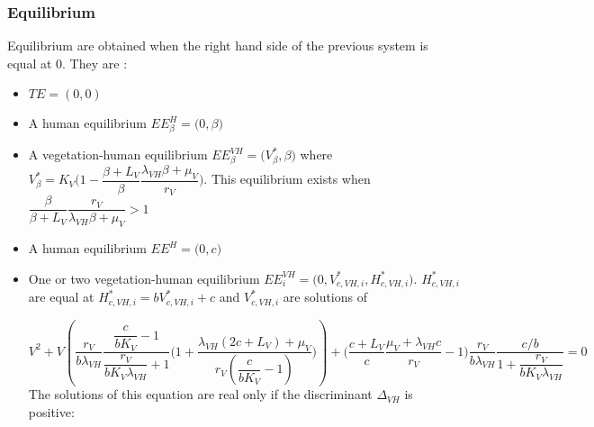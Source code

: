 \documentclass{article}
\newcommand{\lv}{\lambda_{VH}}
\begin{document}
\subsubsection{Equilibrium}
Equilibrium are obtained when the right hand side of the previous system is equal at 0. They are :
\begin{itemize}
\item $TE = (0,0)$
\item A human equilibrium $EE^H_\beta = \Big(0,\beta \Big)$
\item A vegetation-human equilibrium $EE^{VH}_\beta = \Big(V^*_{\beta}, \beta \Big)$ where $V^*_\beta = K_V \Big(1- \dfrac{\beta + L_V}{\beta} \dfrac{\lv \beta + \mu_V}{r_V} \Big)$. This equilibrium exists when $\dfrac{\beta}{\beta + L_V} \dfrac{r_V}{\lv \beta + \mu_V} > 1$
\item A human equilibrium $EE^H = \Big(0,c\Big)$
\item One or two vegetation-human equilibrium $EE^{VH}_i = \Big(0, V^*_{c, VH,i}, H^*_{c, VH,i} \Big)$. $H^*_{c, VH,i}$ are equal at $H^*_{c, VH, i} = bV^*_{c,VH, i} + c$ and $V^*_{c, VH,i}$ are solutions of
%
%

\begin{equation}
V^2 + V \left(\dfrac{r_V}{b\lv} \dfrac{\dfrac{c}{bK_V} -1}{\dfrac{r_V}{b K_V \lv} +1} \Big(1+ \dfrac{\lv(2c+L_V) + \mu_V}{r_V(\dfrac{c}{bK_V} -1) } \Big) \right) + \Big(\dfrac{c+L_V}{c} \dfrac{\mu_V + \lv c}{r_V} - 1\Big)\dfrac{r_V}{b\lv} \dfrac{c/b}{1 + \dfrac{r_V}{b K_V \lv}} = 0
\label{equilibreVH:equationV}
\end{equation}
The solutions of this equation are real only if the discriminant $\Delta_{VH}$ is positive:


\end{itemize}
\end{document}
